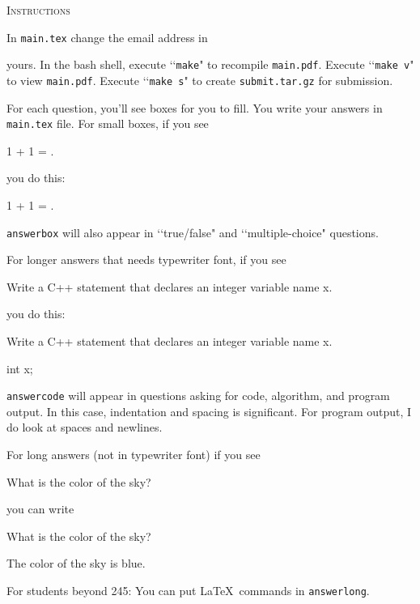 
\textsc{Instructions}

In \verb!main.tex! change the email address in
\begin{console}
\renewcommand\AUTHOR{jdoe5@cougars.ccis.edu} 
\end{console}
yours.
In the bash shell, execute \lq\lq \verb!make!" to recompile \verb!main.pdf!.
Execute \lq\lq \verb!make v!" to view \verb!main.pdf!.
Execute \lq\lq \verb!make s!" to create \verb!submit.tar.gz! for submission.

For each question, you'll see boxes for you to fill.
You write your answers in \verb!main.tex! file.
For small boxes, if you see
\begin{console}[frame=single=single,fontsize=\small]
1 + 1 = \answerbox{}.
\end{console}
you do this:
\begin{console}[frame=single=single,fontsize=\small]
1 + 1 = .
\end{console}
\verb!answerbox! will also appear in
\lq\lq true/false" and \lq\lq multiple-choice"
questions.

For longer answers that needs typewriter font, if you see
\begin{console}[frame=single=single, fontsize=\small]
Write a C++ statement that declares an integer variable name x.
\begin{answercode}
\end{answercode}
\end{console}
you do this:
\begin{console}[frame=single=single, fontsize=\small]
Write a C++ statement that declares an integer variable name x.
\begin{answercode}
int x;
\end{answercode}
\end{console}
\verb!answercode! will appear in questions asking for
code, algorithm, and program output.
In this case, indentation and spacing is significant.
For program output, I do look at spaces and newlines.

For long answers (not in typewriter font) if you see
\begin{console}[frame=single=single, fontsize=\small]
What is the color of the sky?
\begin{answerlong}
\end{answerlong}
\end{console}
you can write
\begin{console}[frame=single=single, fontsize=\small]
What is the color of the sky?
\begin{answerlong}
The color of the sky is blue.
\end{answerlong}
\end{console}
For students beyond 245: You can put \LaTeX\ commands in \verb!answerlong!.

